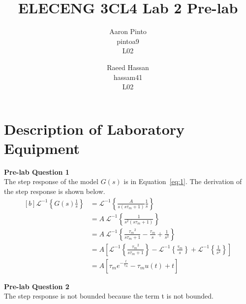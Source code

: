 \documentclass[12pt]{article}
\title{ELECENG 3CL4 Lab 2 Pre-lab}
\author{
    Aaron Pinto \\
    pintoa9 \\
    L02
    \and
    Raeed Hassan \\
    hassam41 \\
    L02
}
\begin{document}
\maketitle
\clearpage

\section{Description of Laboratory Equipment}
\textbf{Pre-lab Question 1} \\ %
The step response of the model $G(s)$ is in Equation~\ref{eq:1}. The derivation of the step response is shown below.
\begin{equation} \label{eq:1}
\begin{aligned}[b]
    \mathscr{L}^{-1} \left\{ G(s) \frac{1}{s} \right\} &= \mathscr{L}^{-1} \left\{ \frac{A} {s(s\tau_m + 1)} \frac{1}{s} \right\} \\
    &= A \ \mathscr{L}^{-1} \left\{ \frac{1} {s^2(s\tau_m + 1)} \right\} \\
    &= A \ \mathscr{L}^{-1} \left\{ \frac{{\tau_m}^2} {s\tau_m + 1} - \frac{\tau_m}{s} + \frac{1}{s^2} \right\} \\
    &= A \left[ \mathscr{L}^{-1} \left\{ \frac{{\tau_m}^2} {s\tau_m + 1} \right\} - \mathscr{L}^{-1} \left\{ \frac{\tau_m}{s} \right\} + \mathscr{L}^{-1} \left\{ \frac{1}{s^2} \right\} \right] \\
    &= A \left[ \tau_m e^{-\frac{t}{\tau_m}} - \tau_m u(t) + t \right]
\end{aligned}
\end{equation}

\textbf{Pre-lab Question 2} \\ %
The step response is not bounded because the term t is not bounded.
\end{document}
